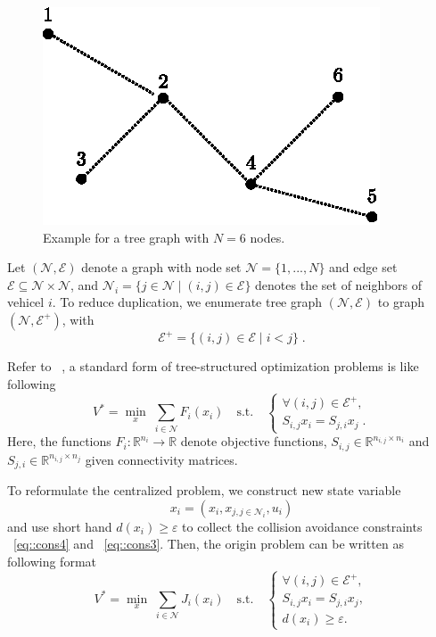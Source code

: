 \documentclass[letterpaper, 10 pt, conference]{ieeeconf}
\begin{document}
\begin{figure}[H]
	\centering
	\includegraphics[width=0.55\linewidth]{pic/topology_simple.eps}
	\caption{Example for a tree graph with $N=6$ nodes.}
	\label{fig::topology1}
\end{figure}

Let $(\mathcal{N},\mathcal{E})$ denote a graph with node set $\mathcal{N}=\{1,...,N\}$
and edge set $\mathcal{E}\subseteq \mathcal{N}\times \mathcal{N}$, and $\mathcal N_i = \{ j \in \mathcal N \mid (i,j) \in \mathcal E \}$ denotes
the set of neighbors of vehicel $i$. To reduce duplication, we enumerate tree graph $(\mathcal N, \mathcal E)$ to graph $(\mathcal N, \mathcal E^+)$, with
$$\mathcal E^+ = \{ (i,j) \in \mathcal E \mid i < j \} \; .$$

Refer to ~\cite{JiangTree}, a standard form of tree-structured optimization problems is like following
\begin{equation}
V^* = \min_{x} \; \sum_{ i \in \mathcal{N}} F_{i}(x_i) \quad \text{s.t.} \quad \left\{
\begin{array}{l}
\forall (i,j) \in \mathcal E^+, \\[0.1cm]
S_{i,j}x_{i}=S_{j,i}x_{j}\; .
\end{array}
\right.
\end{equation} 
Here, the functions $F_i: \mathbb R^{n_i} \to \mathbb R$ denote objective functions,
$S_{i,j} \in \mathbb{R}^{n_{i,j}\times n_i}$ and $S_{j,i}\in \mathbb{R}^{n_{i,j}\times n_j}$ given connectivity matrices.

To reformulate the centralized problem, we construct new state variable $$ x_i = (x_i,x_{j,j\in \mathcal{N}_{i}},u_i)$$
and use short hand $d(x_i)\geq\varepsilon$ to collect the collision avoidance constraints ~\eqref{eq::cons4} and ~\eqref{eq::cons3}. Then, the origin problem can be written as following format
\begin{equation}
\label{eq::reform}
V^* = \min_{x} \; \sum_{ i \in \mathcal{N}} J_{i}(x_i) \quad \text{s.t.} \quad \left\{
\begin{array}{l}
\forall (i,j) \in \mathcal E^+, \\[0.1cm]
S_{i,j}x_{i}=S_{j,i}x_{j}, \\[0.1cm]
d(x_i)\geq\varepsilon .
\end{array}
\right.
\end{equation} 
\end{document}
